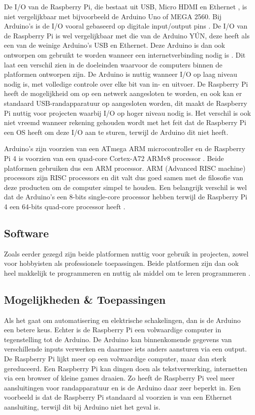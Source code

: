 \documentclass[a4paper, dutch, abstract=true]{scrartcl}
\begin{document}
De I/O van de Raspberry Pi, die bestaat uit USB, Micro HDMI en Ethernet \cite{raspberry20194bspecs},
is niet vergelijkbaar met bijvoorbeeld de Arduino Uno of MEGA 2560.
Bij Arduino's is de I/O vooral gebaseerd op digitale input/output pins
\cite{arduino2019mega,arduino2019uno}.
De I/O van de Raspberry Pi is wel vergelijkbaar met die van de Arduino Y{\'U}N, deze heeft als een
van de weinige Arduino's USB en Ethernet.
Deze Arduino is dan ook ontworpen om gebruikt te worden wanneer een internetverbinding nodig is
\cite{arduino2019yun}.
Dit laat een verschil zien in de doeleinden waarvoor de computers binnen de platformen ontworpen
zijn.
De Arduino is nuttig wanneer I/O op laag niveau nodig is, met volledige controle over elke bit van
in- en uitvoer.
De Raspberry Pi heeft de mogelijkheid om op een netwerk aangesloten te worden, en ook kan er
standaard USB-randapparatuur op aangesloten worden, dit maakt de Raspberry Pi nuttig voor projecten
waarbij I/O op hoger niveau nodig is.
Het verschil is ook niet vreemd wanneer rekening gehouden wordt met het feit dat de Raspberry Pi een
OS heeft om deze I/O aan te sturen, terwijl de Arduino dit niet heeft.

Arduino's zijn voorzien van een ATmega ARM microcontroller
\cite{arduino2019mega,arduino2019uno,arduino2019yun,arduino2019leonardo,kumar2015arduino} en de
Raspberry Pi 4 is voorzien van een quad-core Cortex-A72 ARMv8 processor \cite{raspberry2019brief}.
Beide platformen gebruiken dus een ARM processor.
ARM (Advanced RISC machine) processors zijn RISC processors en dit valt dus goed samen met de
filosofie van deze producten om de computer simpel te houden.
Een belangrijk verschil is wel dat de Arduino's een 8-bits single-core processor hebben terwijl de
Raspberry Pi 4 een 64-bits quad-core processor heeft \cite{raspberry2019brief}.

\subsection{Software}
Zoals eerder gezegd zijn beide platformen nuttig voor gebruik in projecten, zowel voor hobbyisten
als professionele toepassingen.
Beide platformen zijn dan ook heel makkelijk te programmeren en nuttig als middel om te leren
programmeren \cite{raspberry2015what,jamieson2011arduino,rubio2013using}.

\subsection{Mogelijkheden \& Toepassingen}
Als het gaat om automatisering en elektrische schakelingen, dan is de Arduino een betere keus.
Echter is de Raspberry Pi een volwaardige computer in tegenstelling tot de Arduino.
De Arduino kan binnenkomende gegevens van verschillende inputs verwerken en daarmee iets anders
aansturen via een output.
De Raspberry Pi lijkt meer op een volwaardige computer, maar dan sterk gereduceerd.
Een Raspberry Pi kan dingen doen als tekstverwerking, internetten via een browser of kleine games
draaien.
Zo heeft de Raspberry Pi veel meer aansluitingen voor randapparatuur en is de Arduino daar zeer
beperkt in.
Een voorbeeld is dat de Raspberry Pi standaard al voorzien is van een Ethernet aansluiting,
terwijl dit bij Arduino niet het geval is.
\end{document}
